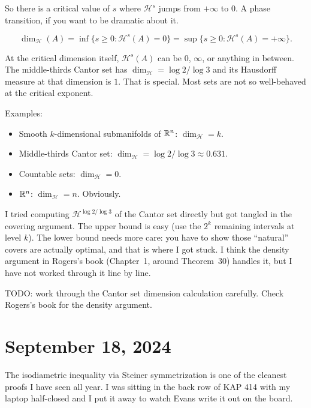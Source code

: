 So there is a critical value of $s$ where $\mathcal{H}^s$ jumps from
$+\infty$ to $0$. A phase transition, if you want to be dramatic about it.

\begin{definition}\label{def:hausdorff-dim}
\[
  \dim_{\mathcal{H}}(A)
  = \inf\!\bigl\{ s \ge 0 : \mathcal{H}^s(A) = 0 \bigr\}
  = \sup\!\bigl\{ s \ge 0 : \mathcal{H}^s(A) = +\infty \bigr\}.
\]
\end{definition}

At the critical dimension itself, $\mathcal{H}^s(A)$ can be $0$, $\infty$,
or anything in between. The middle-thirds Cantor set has
$\dim_\mathcal{H} = \log 2 / \log 3$ and its Hausdorff measure at that
dimension is $1$. That is special. Most sets are not so well-behaved at the critical exponent.

Examples:
\begin{itemize}[nosep]
  \item Smooth $k$-dimensional submanifolds of $\mathbb{R}^n$:
        $\dim_\mathcal{H} = k$.
  \item Middle-thirds Cantor set:
        $\dim_\mathcal{H} = \log 2 / \log 3 \approx 0.631$.
  \item Countable sets: $\dim_\mathcal{H} = 0$.
  \item $\mathbb{R}^n$: $\dim_\mathcal{H} = n$. Obviously.
\end{itemize}

I tried computing $\mathcal{H}^{\log 2/\log 3}$ of the Cantor set
directly but got tangled in the covering argument. The upper bound is
easy (use the $2^k$ remaining intervals at level $k$). The lower bound
needs more care: you have to show those ``natural'' covers are actually
optimal, and that is where I got stuck. I think the density argument in Rogers's book (Chapter~1, around Theorem~30) handles it, but I have not worked through it line by line.

TODO: work through the Cantor set dimension calculation carefully. Check
Rogers's book for the density argument.


\section{September 18, 2024}\label{sec:lec7}

The isodiametric inequality via Steiner
symmetrization is one of the cleanest proofs I have seen all year. I was sitting in the back row of KAP 414 with my laptop half-closed and I put it away to watch Evans write it out on the board.

